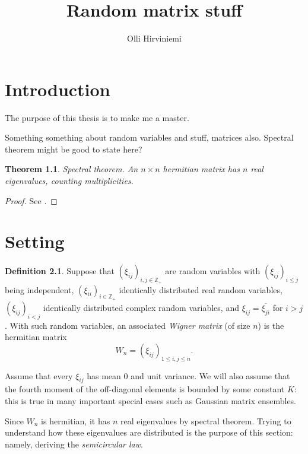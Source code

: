 \documentclass[12pt,a4paper,leqno]{report}
\title{Random matrix stuff}
\author{Olli Hirviniemi}
\date{}
\newcommand{\Z}{\mathbb{Z}}
\theoremstyle{plain}
\newtheorem{theo}[equation]{Theorem}
\theoremstyle{definition}
\newtheorem{defi}[equation]{Definition}
\theoremstyle{remark}
\begin{document}
\maketitle

\tableofcontents

\chapter{Introduction}\label{intro}

The purpose of this thesis is to make me a master.


Something something about random variables and stuff, matrices also. Spectral theorem might be good to state here?

\begin{theo}\label{specth}
\emph{Spectral theorem.} An $n \times n$ hermitian matrix has $n$ real eigenvalues, counting multiplicities.
\end{theo}

\begin{proof}
See \cite{Tao}.
\end{proof}

\chapter{Setting}\label{setup}

\begin{defi}
Suppose that $(\xi_{ij})_{i,j \in \Z_+}$ are random variables with $(\xi_{ij})_{i \leq j}$ being independent, $(\xi_{ii})_{i \in \Z_+}$ identically distributed real random variables, $(\xi_{ij})_{i<j}$ identically distributed complex random variables, and $\xi_{ij}=\overline{\xi_{ji}}$ for $i>j$. With such random variables, an associated \emph{Wigner matrix} (of size $n$) is the hermitian matrix
\begin{equation*}
W_n = (\xi_{ij})_{1\leq i,j \leq n}.
\end{equation*} 
\end{defi}

Assume that every $\xi_{ij}$ has mean $0$ and unit variance. We will also assume that the fourth moment of the off-diagonal elements is bounded by some constant $K$: this is true in many important special cases such as Gaussian matrix ensembles.

Since $W_n$ is hermitian, it has $n$ real eigenvalues by spectral theorem.
Trying to understand how these eigenvalues are distributed is the purpose of this section: namely, deriving the \emph{semicircular law}.
\end{document}
